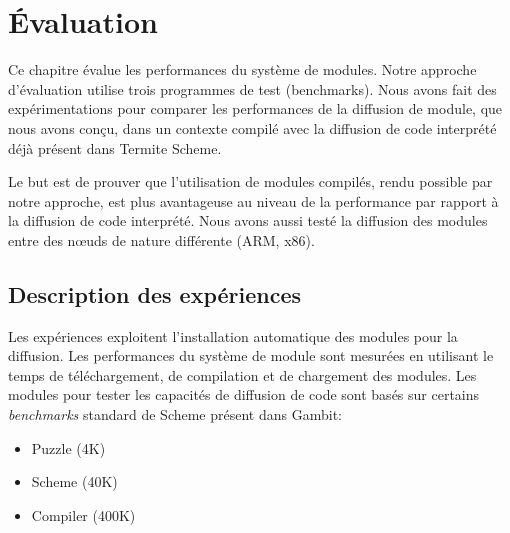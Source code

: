 \chapter{Évaluation}

Ce chapitre évalue les performances du système de modules.  Notre approche
d'évaluation utilise trois programmes de test (benchmarks). Nous avons
fait des expérimentations pour comparer les performances de la diffusion de
module, que nous avons conçu, dans un contexte compilé avec la diffusion
de code interprété déjà présent dans Termite Scheme.

Le but est de prouver que l'utilisation de modules compilés, rendu possible par
notre approche, est plus avantageuse au niveau de la performance par rapport à
la diffusion de code interprété. Nous avons aussi testé la diffusion des modules
entre des nœuds de nature différente (ARM, x86).




\section{Description des expériences}

Les expériences exploitent l'installation automatique des modules pour la
diffusion.  Les performances du système de module sont mesurées en utilisant le
temps de téléchargement, de compilation et de chargement des modules. Les
modules pour tester les capacités de diffusion de code sont basés sur certains
\textit{benchmarks} standard de Scheme présent dans Gambit:

\begin{itemize}
  \item Puzzle (4K)
  \item Scheme (40K)
  \item Compiler (400K)
\end{itemize}

